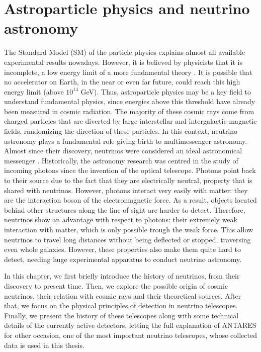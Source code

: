 \chapter{Astroparticle physics and neutrino astronomy}
\label{chap:astro}

The Standard Model (SM) of the particle physics explains almost all available experimental results nowadays. However, it is believed by physicists that it is incomplete, a low energy limit of a more fundamental theory \cite{Maurizio}. It is possible that no accelerator on Earth, in the near or even far future, could reach this high energy limit (above $10^{14}$ GeV). Thus, astroparticle physics may be a key field to understand fundamental physics, since energies above this threshold have already been measured in cosmic radiation. The majority of these cosmic rays come from charged particles that are diverted by large interstellar and intergalactic magnetic fields, randomizing the direction of these particles. In this context, neutrino astronomy plays a fundamental role giving birth to multimessenger astronomy. Almost since their discovery, neutrinos were considered an ideal astronomical messenger \cite{astro_neutrino}. Historically, the astronomy research was centred in the study of incoming photons since the invention of the optical telescope. Photons point back to their source due to the fact that they are electrically neutral, property that is shared with neutrinos. However, photons interact very easily with matter: they are the interaction boson of the electromagnetic force. As a result, objects located behind other structures along the line of sight are harder to detect. Therefore, neutrinos show an advantage with respect to photons: their extremely weak interaction with matter, which is only possible trough the weak force. This allow neutrinos to travel long distances without being deflected or stopped, traversing even whole galaxies. However, these properties also make them quite hard to detect, needing huge experimental apparatus to conduct neutrino astronomy.

In this chapter, we first briefly introduce the history of neutrinos, from their discovery to present time. Then, we explore the possible origin of cosmic neutrinos, their relation with cosmic rays and their theoretical sources. After that, we focus on the physical principles of detection in neutrino telescopes. Finally, we present the history of these telescopes along with some technical details of the currently active detectors, letting the full explanation of ANTARES for other occasion, one of the most important neutrino telescopes, whose collected data is used in this thesis.

